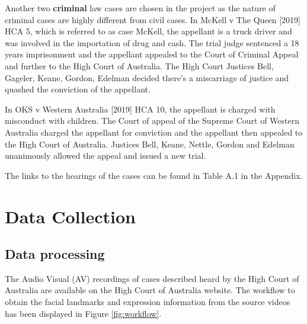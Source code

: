 \documentclass{monashthesis}
\begin{document}
Another two \textbf{criminal} law cases are chosen in the project as the nature of criminal cases are highly different from civil cases. In McKell v The Queen {[}2019{]} HCA 5, which is referred to as case McKell, the appellant is a truck driver and was involved in the importation of drug and cash. The trial judge sentenced a 18 years imprisonment and the appellant appealed to the Court of Criminal Appeal and further to the High Court of Australia. The High Court Justices Bell, Gageler, Keane, Gordon, Edelman decided there's a miscarriage of justice and quashed the conviction of the appellant.

In OKS v Western Australia {[}2019{]} HCA 10, the appellant is charged with misconduct with children. The Court of appeal of the Supreme Court of Western Australia charged the appellant for conviction and the appellant then appealed to the High Court of Australia. Justices Bell, Keane, Nettle, Gordon and Edelman unanimously allowed the appeal and issued a new trial.

The links to the hearings of the cases can be found in Table A.1 in the Appendix.

\let\cleardoublepage\clearpage

\hypertarget{data-collection}{%
\chapter{Data Collection}\label{data-collection}}

\hypertarget{data-processing}{%
\section{Data processing}\label{data-processing}}

The Audio Visual (AV) recordings of cases described heard by the High Court of Australia are available on the High Court of Australia website. The workflow to obtain the facial landmarks and expression information from the source videos has been displayed in Figure \ref{fig:workflow}.
\end{document}
